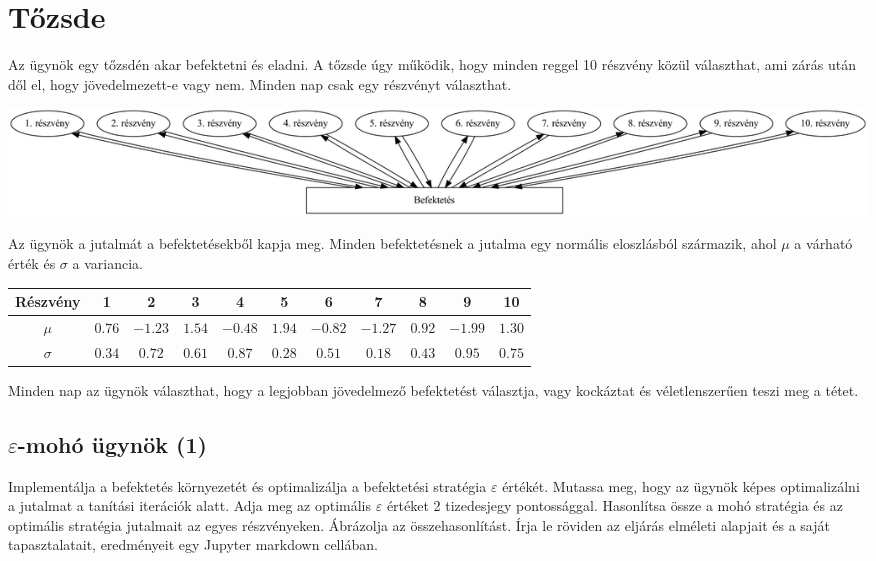 \documentclass[english]{article}
\begin{document}
\newpage

\section{Tőzsde}

Az ügynök egy tőzsdén akar befektetni és eladni. A tőzsde úgy működik, hogy minden reggel 10 részvény közül választhat, ami zárás után dől el, hogy jövedelmezett-e vagy nem. Minden nap csak egy részvényt választhat.

\begin{center}
\includegraphics[width=\textwidth, keepaspectratio]{graphs/2_tozsde.png}
\end{center}

Az ügynök a jutalmát a befektetésekből kapja meg. Minden befektetésnek a jutalma egy normális eloszlásból származik, ahol $\mu$ a várható érték és $\sigma$ a variancia. 

\begin{center}
\begin{tabular}{|c|c|c|c|c|c|c|c|c|c|c|}
\hline
Részvény & 1 & 2 & 3 & 4 & 5 & 6 & 7 & 8 & 9 & 10 \\
\hline
$\mu$ & $0.76$ & $-1.23$ & $1.54$ & $-0.48$ & $1.94$ & $-0.82$ & $-1.27$ & $0.92$ & $-1.99$ & $1.30$ \\
\hline
$\sigma$ & $0.34$ & $0.72$ & $0.61$ & $0.87$ & $0.28$ & $0.51$ & $0.18$ & $0.43$ & $0.95$ & $0.75$ \\
\hline
\end{tabular}
\end{center}

Minden nap az ügynök választhat, hogy a legjobban jövedelmező befektetést választja, vagy kockáztat és véletlenszerűen teszi meg a tétet. 

\subsection{$\varepsilon$-mohó ügynök (1)}

Implementálja a befektetés környezetét és optimalizálja a befektetési stratégia $\varepsilon$ értékét. Mutassa meg, hogy az ügynök képes optimalizálni a jutalmat a tanítási iterációk alatt. Adja meg az optimális $\varepsilon$ értéket 2 tizedesjegy pontossággal. Hasonlítsa össze a mohó stratégia és az optimális stratégia jutalmait az egyes részvényeken. Ábrázolja az összehasonlítást. Írja le röviden az eljárás elméleti alapjait és a saját tapasztalatait, eredményeit egy Jupyter markdown cellában.
\end{document}
